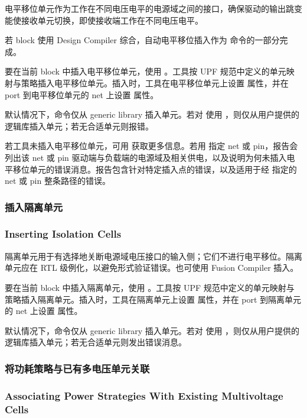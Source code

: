电平移位单元作为工作在不同电压电平的电源域之间的接口，确保驱动的输出跳变能使接收单元切换，即使接收端工作在不同电压电平。

\begin{noteBox}
若 block 使用 Design Compiler 综合，自动电平移位插入作为  命令的一部分完成。
\end{noteBox}

要在当前 block 中插入电平移位单元，使用 。工具按 UPF 规范中定义的单元映射与策略插入电平移位单元。插入时，工具在电平移位单元上设置  属性，并在 port 到电平移位单元的 net 上设置  属性。

默认情况下，命令仅从 generic library 插入单元。若对  使用 ，则仅从用户提供的逻辑库插入单元；若无合适单元则报错。

若工具未插入电平移位单元，可用  获取更多信息。若用  指定 net 或 pin，报告会列出该 net 或 pin 驱动端与负载端的电源域及相关供电，以及说明为何未插入电平移位单元的错误消息。报告包含针对特定插入点的错误，以及适用于经  指定的 net 或 pin 整条路径的错误。

\subsubsection{插入隔离单元}
\subsubsection*{Inserting Isolation Cells}

隔离单元用于有选择地关断电源域电压接口的输入侧；它们不进行电平移位。隔离单元应在 RTL 级例化，以避免形式验证错误。也可使用 Fusion Compiler 插入。

要在当前 block 中插入隔离单元，使用 。工具按 UPF 规范中定义的单元映射与策略插入隔离单元。插入时，工具在隔离单元上设置  属性，并在 port 到隔离单元的 net 上设置  属性。

默认情况下，命令仅从 generic library 插入单元。若对  使用 ，则仅从用户提供的逻辑库插入单元；若无合适单元则发出错误消息。

\subsubsection{将功耗策略与已有多电压单元关联}
\subsubsection*{Associating Power Strategies With Existing Multivoltage Cells}

